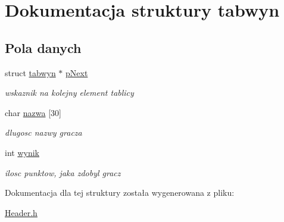 \hypertarget{structtabwyn}{}\section{Dokumentacja struktury tabwyn}
\label{structtabwyn}
\subsection*{Pola danych}
\begin{DoxyCompactItemize}
\item 
\mbox{\label{structtabwyn_a6b732b0d56278fb60826f6e7935b34bc}} 
struct \mbox{\hyperlink{structtabwyn}{tabwyn}} $\ast$ \mbox{\hyperlink{structtabwyn_a6b732b0d56278fb60826f6e7935b34bc}{p\+Next}}
\begin{DoxyCompactList}\small\item\em wskaznik na kolejny element tablicy \end{DoxyCompactList}\item 
\mbox{\label{structtabwyn_ae354a59a9af7719245cabb196fe2a415}} 
char \mbox{\hyperlink{structtabwyn_ae354a59a9af7719245cabb196fe2a415}{nazwa}} \mbox{[}30\mbox{]}
\begin{DoxyCompactList}\small\item\em dlugosc nazwy gracza \end{DoxyCompactList}\item 
\mbox{\label{structtabwyn_ab02eb8b2117ee3f2a0d6d79bbcb076e9}} 
int \mbox{\hyperlink{structtabwyn_ab02eb8b2117ee3f2a0d6d79bbcb076e9}{wynik}}
\begin{DoxyCompactList}\small\item\em ilosc punktow, jaka zdobyl gracz \end{DoxyCompactList}\end{DoxyCompactItemize}


Dokumentacja dla tej struktury została wygenerowana z pliku\+:\begin{DoxyCompactItemize}
\item 
\mbox{\hyperlink{_header_8h}{Header.\+h}}\end{DoxyCompactItemize}
